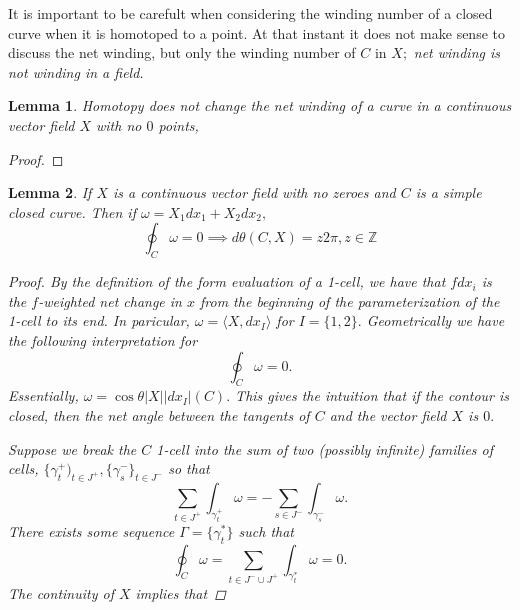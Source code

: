 \documentclass[letter]{article}
\newtheorem{lemma}{Lemma}
\newenvironment{menumerate}{%
  \edef\backupindent{\the\parindent}%
  \enumerate%
  \setlength{\parindent}{\backupindent}%
}{\endenumerate}
\begin{document}
\begin{menumerate}
    It is important to be carefult when considering the winding number of a closed curve when it is homotoped to a
    point. At that instant it does not make sense to discuss the net winding, but only the winding number of $C$ in $X;$
    \emph{net winding is not winding in a field.}

    \begin{lemma}
        Homotopy does not change the net winding of a curve in a continuous vector field $X$ with no $0$ points, 
    \end{lemma}
    \begin{proof}
           
    \end{proof}



    \begin{lemma}
        If $X$ is a continuous vector field with no zeroes and $C$ is a simple closed curve. Then if 
        $\omega = X_1 dx_1 + X_2 dx_2,$ 
        \begin{equation}
            \oint_C \omega =0 \implies d\theta(C,X) = z2\pi, z \in \mathbb{Z}
        \end{equation}
        \begin{proof}
            By the definition of the form evaluation of a 1-cell,
            we have that $fdx_i$ is the $f$-weighted net change in $x$ 
            from the beginning of the parameterization of the 1-cell
            to its end. In paricular, $\omega = \langle X, dx_I\rangle$ for 
            $I = \{1,2\}.$ Geometrically we have the following interpretation
            for
             \begin{equation}
                \oint_C \omega = 0.
            \end{equation}
            Essentially, $\omega = \cos \theta |X||dx_I| (C).$ This gives the intuition
            that if the contour is closed, then the net angle between the tangents of $C$
            and the vector field $X$ is $0.$ 

            Suppose we break the $C$ 1-cell into the sum of two  (possibly infinite) 
            families of cells, $\{\gamma^+_t)_{t\in J^+}, \{\gamma^-_s\}_{t\in J^-}$ so that
            \begin{equation}
                \sum_{t\in J^+}  \int_{\gamma^+_t} \omega = -\sum_{s \in J^-} \int_{\gamma^-_s} \omega. 
            \end{equation}
            There exists some sequence $\Gamma = \{\gamma^*_t\}$ such that
            \begin{equation}
                \oint_C \omega = \sum_{t\in J^- \cup J^+} \int_{\gamma_t^*} \omega = 0.
            \end{equation}
            The continuity of $X$ implies that
        \end{proof}
    \end{lemma}
\end{menumerate}

\end{document}

